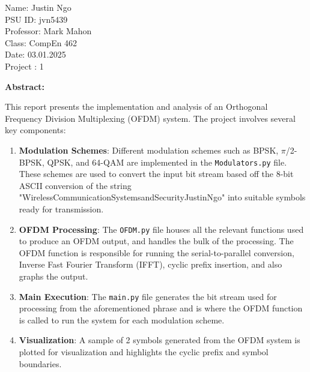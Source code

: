 \documentclass[letterpaper, 11pt]{article}
\def\class{CompEn 462}
\def\homeworkNumber{1}
\def\date{03.01.2025}
\def\professor{Mark Mahon}
\newcommand{\secHeader}[1]{\vspace{2mm} \noindent \textbf{#1:}\vspace{-4mm}}
\begin{document}
\hfill
\newline
Name: Justin Ngo
\\PSU ID: jvn5439
\\Professor: \professor
\\Class: \class
\\Date: \date
\\Project : \homeworkNumber

\newpage
\secHeader{Abstract}
\vspace{5mm}

This report presents the implementation and analysis of an Orthogonal Frequency Division Multiplexing (OFDM) system. 
The project involves several key components:

\begin{enumerate}
    \item \textbf{Modulation Schemes}: Different modulation schemes such as BPSK, $\pi$/2-BPSK, QPSK, and 64-QAM are implemented in the 
    \texttt{Modulators.py} file. These schemes are used to convert the input bit stream based off the 8-bit ASCII conversion of the string "WirelessCommunicationSystemsandSecurityJustinNgo"
    into suitable symbols ready for transmission.

    \item \textbf{OFDM Processing}: The \texttt{OFDM.py} file houses all the relevant functions used to produce an OFDM output, and handles the bulk of the processing.
    The OFDM function is responsible for running the serial-to-parallel conversion, Inverse Fast Fourier Transform (IFFT), cyclic prefix insertion, and also graphs the output.

    \item \textbf{Main Execution}: The \texttt{main.py} file generates the bit stream used for processing from the aforementioned phrase and is where the OFDM function is called 
    to run the system for each modulation scheme.

    \item \textbf{Visualization}: A sample of 2 symbols generated from the OFDM system is plotted for visualization and highlights the cyclic prefix and symbol boundaries. 
\end{enumerate}
\end{document}
